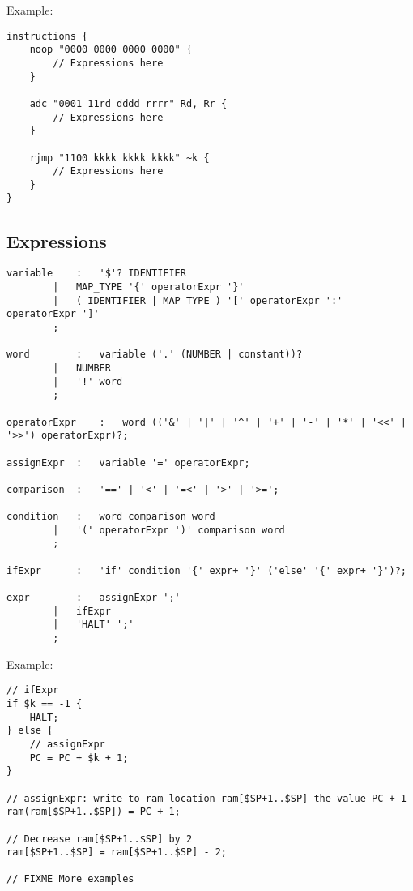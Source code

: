 Example:
\begin{lstlisting}
instructions {
	noop "0000 0000 0000 0000" {
		// Expressions here
	}

	adc "0001 11rd dddd rrrr" Rd, Rr {
		// Expressions here
	}

	rjmp "1100 kkkk kkkk kkkk" ~k {
		// Expressions here
	}
}
\end{lstlisting}

\subsection{Expressions}
\begin{lstlisting}
variable	:	'$'? IDENTIFIER
		|	MAP_TYPE '{' operatorExpr '}'
		|	( IDENTIFIER | MAP_TYPE ) '[' operatorExpr ':' operatorExpr ']'
		;

word 		:	variable ('.' (NUMBER | constant))?
		|	NUMBER
		|	'!' word
		;

operatorExpr	:	word (('&' | '|' | '^' | '+' | '-' | '*' | '<<' | '>>') operatorExpr)?;

assignExpr	:	variable '=' operatorExpr;

comparison	:	'==' | '<' | '=<' | '>' | '>=';

condition	:	word comparison word
		|	'(' operatorExpr ')' comparison word
		;

ifExpr		:	'if' condition '{' expr+ '}' ('else' '{' expr+ '}')?;

expr		:	assignExpr ';'
		|	ifExpr
		|	'HALT' ';'
		;
\end{lstlisting}

Example:
\begin{lstlisting}
// ifExpr
if $k == -1 {
	HALT;
} else {
	// assignExpr
	PC = PC + $k + 1;
}

// assignExpr: write to ram location ram[$SP+1..$SP] the value PC + 1
ram(ram[$SP+1..$SP]) = PC + 1;

// Decrease ram[$SP+1..$SP] by 2
ram[$SP+1..$SP] = ram[$SP+1..$SP] - 2;

// FIXME More examples
\end{lstlisting}
